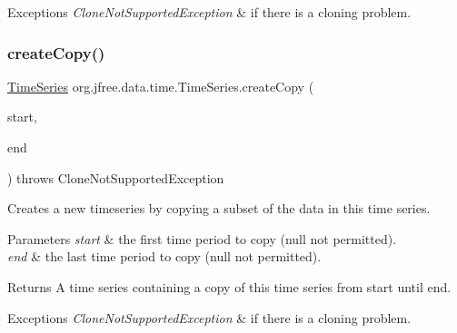 \begin{DoxyExceptions}{Exceptions}
{\em Clone\+Not\+Supported\+Exception} & if there is a cloning problem. \\
\hline
\end{DoxyExceptions}
\mbox{\label{classorg_1_1jfree_1_1data_1_1time_1_1_time_series_a975fb6e05236dc555b575cb6fb2066e9}} 
\subsubsection{\texorpdfstring{create\+Copy()}{createCopy()}\hspace{0.1cm}{\footnotesize\ttfamily [2/2]}}
{\footnotesize\ttfamily \mbox{\hyperlink{classorg_1_1jfree_1_1data_1_1time_1_1_time_series}{Time\+Series}} org.\+jfree.\+data.\+time.\+Time\+Series.\+create\+Copy (\begin{DoxyParamCaption}\item[{\mbox{\hyperlink{classorg_1_1jfree_1_1data_1_1time_1_1_regular_time_period}{Regular\+Time\+Period}}}]{start,  }\item[{\mbox{\hyperlink{classorg_1_1jfree_1_1data_1_1time_1_1_regular_time_period}{Regular\+Time\+Period}}}]{end }\end{DoxyParamCaption}) throws Clone\+Not\+Supported\+Exception}

Creates a new timeseries by copying a subset of the data in this time series.


\begin{DoxyParams}{Parameters}
{\em start} & the first time period to copy ({\ttfamily null} not permitted). \\
\hline
{\em end} & the last time period to copy ({\ttfamily null} not permitted).\\
\hline
\end{DoxyParams}
\begin{DoxyReturn}{Returns}
A time series containing a copy of this time series from start until end.
\end{DoxyReturn}

\begin{DoxyExceptions}{Exceptions}
{\em Clone\+Not\+Supported\+Exception} & if there is a cloning problem. \\
\hline
\end{DoxyExceptions}
\mbox{\label{classorg_1_1jfree_1_1data_1_1time_1_1_time_series_ace2380cf1ca286332cc04de19326d160}} 
